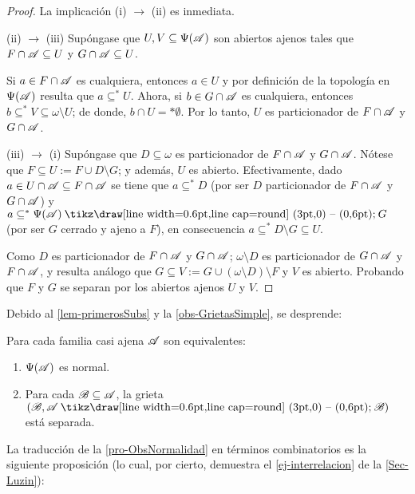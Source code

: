     \begin{proof}
        La implicación (i) $\to$ (ii) es inmediata.

        (ii) $\to$ (iii) Supóngase que $U,V \subseteq \Psi(\mathscr{A})$ son abiertos ajenos tales que $F \cap \mathscr{A} \subseteq U$ y $G \cap \mathscr{A} \subseteq U$.

        Si $a \in F \cap \mathscr{A}$ es cualquiera, entonces $a \in U$ y por definición de la topología en $\Psi(\mathscr{A})$ resulta que $a \subseteq^* U$. Ahora, si $b \in G \cap \mathscr{A}$ es cualquiera, entonces $b \subseteq^* V \subseteq \omega \setminus U$; de donde, $b \cap U =* \emptyset$. Por lo tanto, $U$ es particionador de $F \cap \mathscr{A}$ y $G \cap \mathscr{A}$.

        (iii) $\to$ (i) Supóngase que $D \subseteq \omega$ es particionador de $F \cap \mathscr{A}$ y $G \cap \mathscr{A}$. Nótese que $F \subseteq U:=F \cup D\setminus G$; y además, $U$ es abierto. Efectivamente, dado $a \in U \cap \mathscr{A} \subseteq F \cap \mathscr{A}$ se tiene que $a \subseteq^* D$ (por ser $D$ particionador de $F \cap \mathscr{A}$ y $G \cap \mathscr{A}$) y $a \subseteq^* \Psi(\ms{A}) \setminus G$ (por ser $G$ cerrado y ajeno a $F$), en consecuencia $a \subseteq^* D\setminus G \subseteq U$.

        Como $D$ es particionador de $F \cap \mathscr{A}$ y $G \cap \mathscr{A}$; $\omega \setminus D$ es particionador de $G\cap \mathscr{A}$ y $F \cap \mathscr{A}$, y resulta análogo que $G \subseteq V:=G \cup (\omega \setminus D)\setminus F$ y $V$ es abierto. Probando que $F$ y $G$ se separan por los abiertos ajenos $U$ y $V$.
    \end{proof}

    Debido al \autoref{lem-primerosSubs} y la \autoref{obs-GrietasSimple}, se desprende:

    \begin{corolario}\label{cor-tra-NormalParticionador}
        Para cada familia casi ajena $\mathscr{A}$ son equivalentes:
        \begin{enumerate}
            \item $\Psi(\mathscr{A})$ es normal.
            \item Para cada $\mathscr{B} \subseteq \mathscr{A}$, la grieta $(\ms{B},\ms{A} \setminus \ms{B})$ está separada.
        \end{enumerate}
    \end{corolario}

    La traducción de la \autoref{pro-ObsNormalidad} en términos combinatorios es la siguiente proposición (lo cual, por cierto, demuestra el \autoref{ej-interrelacion} de la \autoref{Sec-Luzin}):

